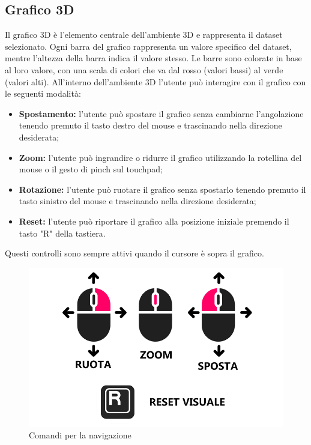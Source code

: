 \subsection{Grafico 3D}
Il grafico 3D è l'elemento centrale dell'ambiente 3D e rappresenta il dataset
selezionato. Ogni barra del grafico rappresenta un valore specifico del
dataset, mentre l'altezza della barra indica il valore stesso. Le barre sono
colorate in base al loro valore, con una scala di colori che va dal rosso
(valori bassi) al verde (valori alti). All’interno dell'ambiente 3D l'utente
può interagire con il grafico con le seguenti modalità:
\begin{itemize}
    \item \textbf{Spostamento:} l'utente può spostare il grafico senza cambiarne 
        l'angolazione tenendo premuto il tasto destro del mouse e trascinando 
        nella direzione desiderata;
    \item \textbf{Zoom:} l'utente può ingrandire o ridurre il grafico
        utilizzando la rotellina del mouse o il gesto di pinch sul touchpad;
    \item \textbf{Rotazione:} l'utente può ruotare il grafico senza spostarlo
        tenendo premuto il tasto sinistro del mouse e trascinando nella direzione desiderata;
    \item \textbf{Reset:} l'utente può riportare il grafico alla posizione 
        iniziale premendo il tasto "R" della tastiera.
\end{itemize}
Questi controlli sono sempre attivi quando il cursore è sopra il grafico.
\clearpage
\begin{figure}[ht!]
    \centering
    \includegraphics[scale=0.6]{template/images/comandi.png}
    \caption{Comandi per la navigazione}
\end{figure}

